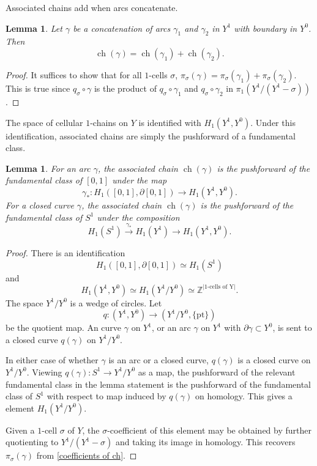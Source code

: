 \documentclass[12pt]{amsart}
\DeclareMathOperator*{\ch}{ch}
\newtheorem{lemma}[theorem]{Lemma}
\theoremstyle{definition}
\begin{document}
Associated chains add when arcs concatenate.

\begin{lemma}\label{ch concatenation} Let $\gamma$ be a concatenation of arcs $\gamma_1$ and $\gamma_2$ in $Y^1$ with boundary in $Y^0$. Then $$\ch(\gamma)=\ch(\gamma_1)+\ch(\gamma_2).$$
\end{lemma}

\begin{proof} It suffices to show that for all $1$-cells $\sigma$, $\pi_\sigma(\gamma)=\pi_\sigma(\gamma_1)+\pi_\sigma(\gamma_2)$. This is true since $q_\sigma\circ \gamma$ is the product of $q_\sigma\circ \gamma_1$ and $q_\sigma\circ \gamma_2$ in $\pi_1(Y^1/(Y^1-\sigma))$.
\end{proof}

The space of cellular $1$-chains on $Y$ is identified with $H_1(Y^1,Y^0)$. Under this identification, associated chains are simply the pushforward of a fundamental class.

\begin{lemma}\label{ch is pushforward of fundamental class} For an arc $\gamma$, the associated chain $\ch(\gamma)$ is the pushforward of the fundamental class of $[0,1]$ under the map $$\gamma_*:H_1([0,1],\partial [0,1])\to H_1(Y^1,Y^0).$$ For a closed curve $\gamma$, the associated chain $\ch(\gamma)$ is the pushforward of the fundamental class of $S^1$ under the composition $$H_1(S^1)\overset{\gamma_*}\to H_1(Y^1)\to H_1(Y^1,Y^0).$$
\end{lemma}

\begin{proof} There is an identification $$H_1([0,1],\partial [0,1])\simeq H_1(S^1)$$ and $$H_1(Y^1,Y^0)\simeq H_1(Y^1/Y^0)\simeq \mathbb{Z}^{|\text{1-cells of Y}|}.$$ The space $Y^1/Y^0$ is a wedge of circles. Let $$q:(Y^1,Y^0)\to (Y^1/Y^0,\{\text{pt}\})$$ be the quotient map. An curve $\gamma$ on $Y^1$, or an arc $\gamma$ on $Y^1$ with $\partial\gamma\subset Y^0$, is sent to a closed curve $q(\gamma)$ on $Y^1/Y^0$. 

In either case of whether $\gamma$ is an arc or a closed curve, $q(\gamma)$ is a closed curve on $Y^1/Y^0$. Viewing $q(\gamma):S^1\to Y^1/Y^0$ as a map, the pushforward of the relevant fundamental class in the lemma statement is the pushforward of the fundamental class of $S^1$ with respect to map induced by $q(\gamma)$ on homology. This gives a element $H_1(Y^1/Y^0)$.

Given a $1$-cell $\sigma$ of $Y$, the $\sigma$-coefficient of this element may be obtained by further quotienting to $Y^1/(Y^1-\sigma)$ and taking its image in homology. This recovers $\pi_\sigma(\gamma)$ from \cref{coefficients of ch}. 
\end{proof}
\end{document}
